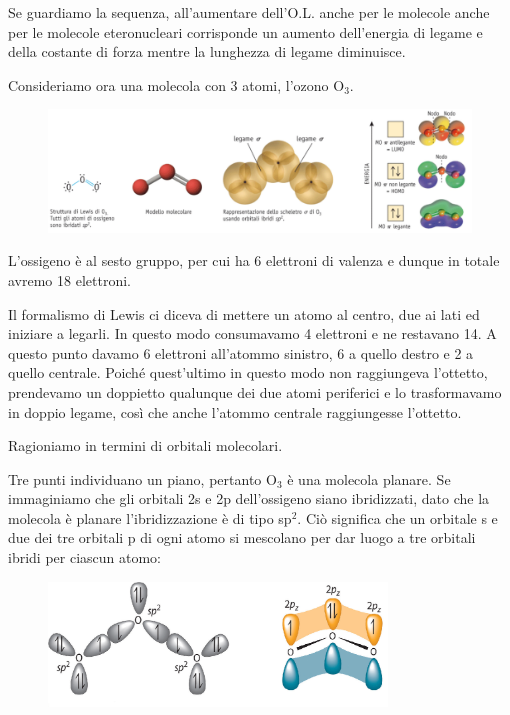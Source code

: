 Se guardiamo la sequenza, all'aumentare dell'O.L. anche per le molecole anche per le molecole eteronucleari corrisponde un aumento dell'energia di legame e della costante di forza mentre la lunghezza di legame diminuisce.

\vspace{0.2cm}Consideriamo ora una molecola con 3 atomi, l'ozono O$_3$.

\begin{figure}[htp]
    \centering
    \includegraphics[width=14cm]{immagini/orbitali_molecolari_O_3.png}
\end{figure}

L'ossigeno è al sesto gruppo, per cui ha 6 elettroni di valenza e dunque in totale avremo 18 elettroni.

Il formalismo di Lewis ci diceva di mettere un atomo al centro, due ai lati ed iniziare a legarli. In questo modo consumavamo 4 elettroni e ne restavano 14. A questo punto davamo 6 elettroni all'atommo sinistro, 6 a quello destro e 2 a quello centrale. Poiché quest'ultimo in questo modo non raggiungeva l'ottetto, prendevamo un doppietto qualunque dei due atomi periferici e lo trasformavamo in doppio legame, così che anche l'atommo centrale raggiungesse l'ottetto.

Ragioniamo in termini di orbitali molecolari.

Tre punti individuano un piano, pertanto O$_3$ è una molecola planare. Se immaginiamo che gli orbitali 2s e 2p dell'ossigeno siano ibridizzati, dato che la molecola è planare l'ibridizzazione è di tipo sp$^2$. Ciò significa che un orbitale s e due dei tre orbitali p di ogni atomo si mescolano per dar luogo a tre orbitali ibridi per ciascun atomo:

\begin{figure}[htp]
    \centering
    \includegraphics[width=9cm]{immagini/orbitali_ibridi_O_3.png}
\end{figure}

